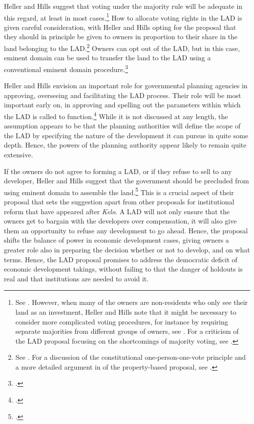 Heller and Hills suggest that voting under the majority rule will be adequate in this regard, at least in most cases.\footnote{See \cite[1496]{heller08}. However, when many of the owners are non-residents who only see their land as an investment, Heller and Hills note that it might be necessary to consider more complicated voting procedures, for instance by requiring separate majorities from different groups of owners, see \cite[1523-1524]{heller08}. For a criticism of the LAD proposal focusing on the shortcomings of majority voting, see \cite{kelly09}.} How to allocate voting rights in the LAD is given careful consideration, with Heller and Hills opting for the proposal that they should in principle be given to owners in proportion to their share in the land belonging to the LAD.\footnote{See \cite[1492]{heller08}. For a discussion of the constitutional one-person-one-vote principle and a more detailed argument in  of the property-based proposal, see \cite[1503-1507]{heller08}.} Owners can opt out of the LAD, but in this case, eminent domain can be used to transfer the land to the LAD using a conventional eminent domain procedure.\footcite[1496]{heller08}

Heller and Hills envision an important role for governmental planning agencies in approving, overseeing and facilitating the LAD process. Their role will be most important early on, in approving and spelling out the parameters within which the LAD is called to function.\footcite[1489-1491]{heller08} While it is not discussed at any length, the assumption appears to be that the planning authorities will define the scope of the LAD by specifying the nature of the development it can pursue in quite some depth. Hence, the powers of the planning authority appear likely to remain quite extensive.

If the owners do not agree to forming a LAD, or if they refuse to sell to any developer, Heller and Hills suggest that the government should be precluded from using eminent domain to assemble the land.\footcite[1491]{heller08} This is a crucial aspect of their proposal that sets the suggestion apart from other proposals for institutional reform that have appeared after {\it Kelo}. A LAD will not only ensure that the owners get to bargain with the developers over compensation, it will also give them an opportunity to refuse any development to go ahead. Hence, the proposal shifts the balance of power in economic development cases, giving owners a greater role also in preparing the decision whether or not to develop, and on what terms. Hence, the LAD proposal promises to address the democratic deficit of economic development takings, without failing to  that the danger of holdouts is real and that institutions are needed to avoid it.

